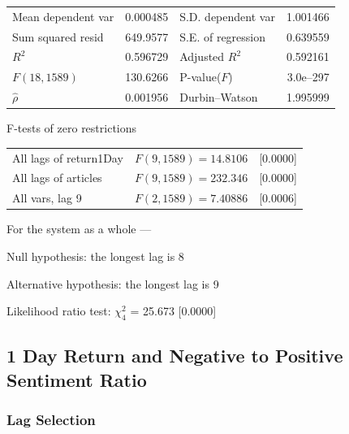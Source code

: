 \begin{center}
\vspace{1ex}
\begin{tabular}{lrlr}
Mean dependent var &  0.000485 & S.D. dependent var &  1.001466 \\
Sum squared resid &  649.9577 & S.E. of regression &  0.639559 \\
$R^2$ &  0.596729 & Adjusted $R^2$ &  0.592161 \\
$F(18, 1589)$ &  130.6266 & P-value($F$) &  3.0\textrm{e--297} \\
$\hat{\rho}$ &  0.001956 & Durbin--Watson &  1.995999 \\
\end{tabular}


\end{center}

\begin{center}
F-tests of zero restrictions\\[1em]
\begin{tabular}{lll}
All lags of return1Day & $F(9, 1589) = 14.8106$ & [0.0000]\\
All lags of articles & $F(9, 1589) = 232.346$ & [0.0000]\\
All vars, lag 9 & $F(2, 1589) = 7.40886$ & [0.0006]\\
\end{tabular}
\end{center}

\clearpage


\noindent For the system as a whole ---\par
Null hypothesis: the longest lag is 8\par
Alternative hypothesis: the longest lag is 9\par
Likelihood ratio test: $\chi^2_{4}$ = 25.673 [0.0000]\par    

\subsection{1 Day Return and Negative to Positive Sentiment Ratio}

\subsubsection{Lag Selection}

